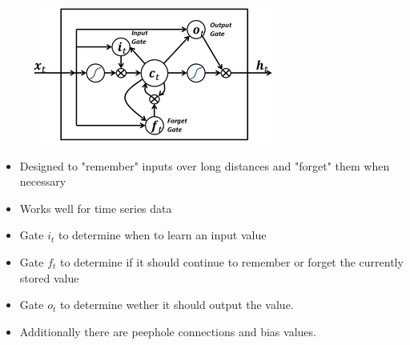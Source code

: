 \documentclass[11pt, a4paper, landscape]{article}
\begin{document}
\NewPage{}

\vfill
\begin{figure}[H]
\begin{center}
  \includegraphics[width=.5\textwidth]{../article/img/Long_Short_Term_Memory}
\end{center}
\end{figure}
\vfill
\begin{itemize}
\item Designed to "remember" inputs over long distances and "forget" them when necessary
\item Works well for time series data
\end{itemize}
\begin{itemize}
\item Gate \(i_t\) to determine when to learn an input value
\item Gate \(f_t\) to determine if it should continue to remember or forget the currently stored value
\item Gate \(o_t\) to determine wether it should output the value.
\item Additionally there are peephole connections and bias values.
\end{itemize}
\vfill


%
\end{document}
